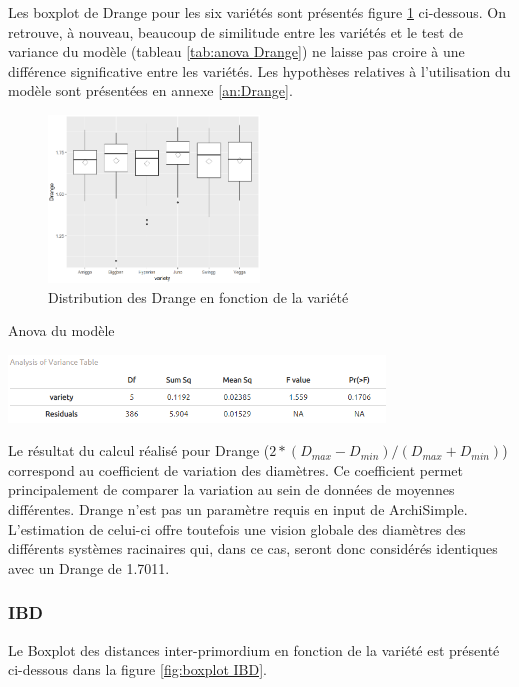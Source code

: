 Les boxplot de Drange pour les six variétés sont présentés figure \ref{fig:boxplot Drange} ci-dessous.
On retrouve, à nouveau, beaucoup de similitude entre les variétés et le test de variance du modèle (tableau \ref{tab:anova Drange}) ne laisse pas croire à une différence significative entre les variétés.
Les hypothèses relatives à l'utilisation du modèle sont présentées en annexe \ref{an:Drange}.

\begin{figure}[ht]
\centering
\includegraphics[width=0.5\textwidth]{Image/boxplot Drange.png}
\caption{Distribution des Drange en fonction de la variété}
\label{fig:boxplot Drange}
\end{figure}

\begin{table}[ht]
    \centering
    \caption{Anova du modèle}
    \includegraphics[width=0.75\textwidth]{Image/anova Drange.png}
    \label{tab:anova Drange}
\end{table}

Le résultat du calcul réalisé pour Drange ($2*(D_{max}-D_{min})/(D_{max}+D_{min})$) correspond au coefficient de variation des diamètres.
Ce coefficient permet principalement de comparer la variation au sein de données de moyennes différentes.
Drange n'est pas un paramètre requis en input de ArchiSimple.
L'estimation de celui-ci offre toutefois une vision globale des diamètres des différents systèmes racinaires qui, dans ce cas, seront donc considérés identiques avec un Drange de 1.7011.

\subsubsection{IBD}

Le Boxplot des distances inter-primordium en fonction de la variété est présenté ci-dessous dans la figure \ref{fig:boxplot IBD}.


